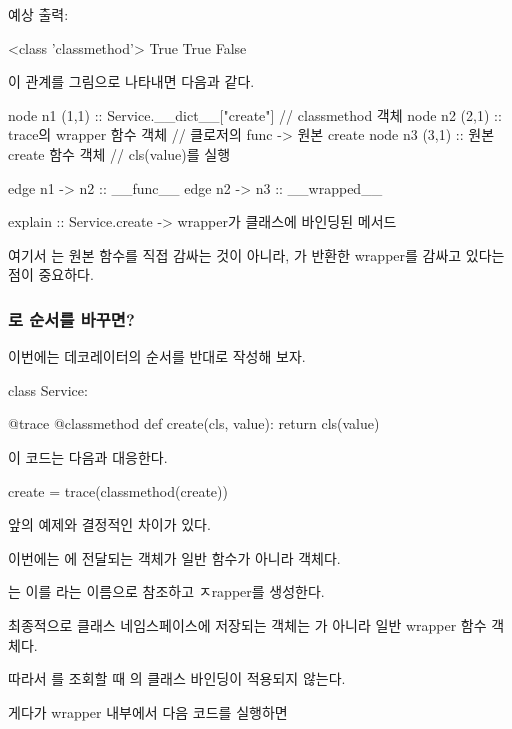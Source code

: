 예상 출력:

\begin{dhkzsh}
<class 'classmethod'>
True
True
False
\end{dhkzsh}

이 관계를 그림으로 나타내면 다음과 같다.

\begin{dhkgraph}[uniform]
node n1 (1,1) :: Service.__dict__["create"] // classmethod 객체
node n2 (2,1) :: trace의 wrapper 함수 객체 // 클로저의 func -> 원본 create
node n3 (3,1) :: 원본 create 함수 객체 // cls(value)를 실행

edge n1 -> n2 :: __func__
edge n2 -> n3 :: __wrapped__

explain :: Service.create -> wrapper가 클래스에 바인딩된 메서드
\end{dhkgraph}

여기서 는 원본 함수를 직접 감싸는 것이 아니라, 가 반환한 wrapper를 감싸고 있다는 점이 중요하다.

\subsubsection{로 순서를 바꾸면?}

이번에는 데코레이터의 순서를 반대로 작성해 보자.

\begin{dhkcode}
class Service:

    @trace
    @classmethod
    def create(cls, value):
        return cls(value)
\end{dhkcode}

이 코드는 다음과 대응한다.

\begin{dhkcode}
create = trace(classmethod(create))
\end{dhkcode}

앞의 예제와 결정적인 차이가 있다.

이번에는 에 전달되는 객체가 일반 함수가 아니라  객체다.

는 이를 라는 이름으로 참조하고 ㅈrapper를 생성한다.

최종적으로 클래스 네임스페이스에 저장되는 객체는 가 아니라 일반 wrapper 함수 객체다.

따라서 를 조회할 때 의 클래스 바인딩이 적용되지 않는다.

게다가 wrapper 내부에서 다음 코드를 실행하면

